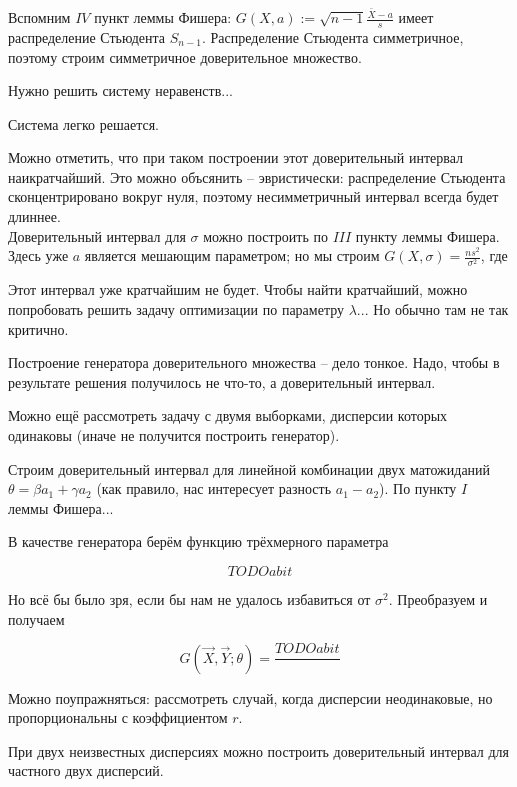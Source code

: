 \documentclass[main.tex]{subfiles}
\begin{document}
Вспомним $ IV $ пункт леммы Фишера: $ G(X, a) := \sqrt{n-1} \frac{\bar X - a}{s} $ имеет распределение Стьюдента $ S_{n-1} $.
Распределение Стьюдента симметричное, поэтому строим симметричное доверительное множество.

Нужно решить систему неравенств... %

Система легко решается.

Можно отметить, что при таком построении этот доверительный интервал наикратчайший.
Это можно объсянить -- эвристически: распределение Стьюдента сконцентрировано вокруг нуля, поэтому несимметричный интервал всегда будет длиннее. \\

Доверительный интервал для $ \sigma $ можно построить по $ III $ пункту леммы Фишера.
Здесь уже $ a $ является мешающим параметром; но мы строим $ G(X, \sigma) = \frac{ns^2}{\sigma^2} $, где 

Этот интервал уже кратчайшим не будет.
Чтобы найти кратчайший, можно попробовать решить задачу оптимизации по параметру $ \lambda $...
Но обычно там не так критично.

\begin{leftbar}
	Построение генератора доверительного множества -- дело тонкое.
	Надо, чтобы в результате решения получилось не что-то, а доверительный интервал.
\end{leftbar}

Можно ещё рассмотреть задачу с двумя выборками, дисперсии которых одинаковы (иначе не получится построить генератор).

Строим доверительный интервал для линейной комбинации двух матожиданий $ \theta = \beta a_1 + \gamma a_2 $ (как правило, нас интересует разность $ a_1 - a_2 $).
По пункту $ I $  леммы Фишера...


В качестве генератора берём функцию трёхмерного параметра

\[ TODO a bit \]

Но всё бы было зря, если бы нам не удалось избавиться от $ \sigma^2 $.
Преобразуем и получаем

\[ G(\vec X, \vec Y; \theta) = \frac{ TODO a bit }{  } \]

\begin{leftbar}
	Можно поупражняться: рассмотреть случай, когда дисперсии неодинаковые, но пропорциональны с коэффициентом $ r $.
\end{leftbar}

При двух неизвестных дисперсиях можно построить доверительный интервал для частного двух дисперсий.
\end{document}
